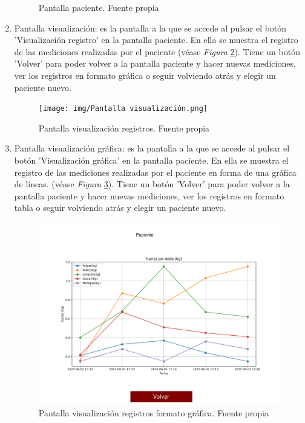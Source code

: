 \begin{enumerate}
\begin{figure}
        \caption{Pantalla paciente. Fuente propia}
        \label{fig:Pantalla paciente}
    \end{figure}
    \item Pantalla visualización: es la pantalla a la que se accede al pulsar el botón 'Visualización registro' en la pantalla paciente. En ella se muestra el registro de las mediciones realizadas por el paciente (véase \textit{Figura} \ref{fig:Pantalla visualización}). Tiene un botón 'Volver' para poder volver a la pantalla paciente y hacer nuevas mediciones, ver los registros en formato gráfica o seguir volviendo atrás y elegir un paciente nuevo.
    \begin{figure}
        \centering
        \texttt{[image: img/Pantalla visualización.png]}
        \caption{Pantalla visualización registros. Fuente propia}
        \label{fig:Pantalla visualización}
    \end{figure}
    \item Pantalla visualización gráfica: es la pantalla a la que se accede al pulsar el botón 'Visualización gráfica' en la pantalla paciente. En ella se muestra el registro de las mediciones realizadas por el paciente en forma de una gráfica de líneas. (véase \textit{Figura} \ref{fig:Pantalla grafica}). Tiene un botón 'Volver' para poder volver a la pantalla paciente y hacer nuevas mediciones, ver los registros en formato tabla o seguir volviendo atrás y elegir un paciente nuevo.
    \begin{figure}
        \centering
        \includegraphics[width=0.75\linewidth]{img/Pantalla grafica.png}
        \caption{Pantalla visualización registros formato gráfica. Fuente propia}
        \label{fig:Pantalla grafica}
    \end{figure}
\end{enumerate}